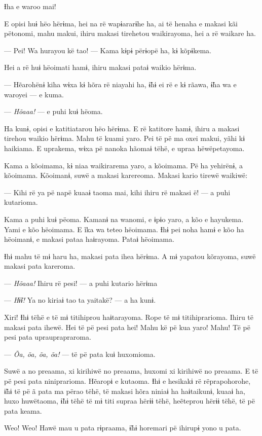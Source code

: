 Ɨha e waroo mai! 

E opisi huɨ hëo hërɨma, hei na rë wapɨararɨhe ha, ai të henaha e makasi
kãi pëtonomi, mahu makui, ihiru makasi tirehetou waikirayoma, hei a rë
waikare ha. 

--- Pei! Wa hurayou kë tao! --- Kama kɨpɨ përɨopë ha, kɨ kõpɨkema. 

Hei a rë huɨ hëoimati hamɨ, ihiru makasi pataɨ waikio hërɨma. 

--- Hẽarohënɨ kiha wɨxa kɨ hõra rë niayahi ha, ɨ̃hɨ ei rë e kɨ rãawa, ɨ̃ha
wa e waroyei --- e kuma. 

--- \textit{Hõaaa!} --- e puhi kuɨ hëoma. 

Ha kunɨ, opisi e katitiatarou hëo hërɨma. E rë katitore hamɨ, ihiru a
makasi tirehou waikio hërɨma. Mahu të kuami yaro. Pei të pë ma oxei
makui, yãhi kɨ haikiama. E uprakema, wɨxa pë nanoka hãomaɨ tëhë, e upraa
hëwëpetayoma. 

Kama a kõoimama, kɨ niaa waikirarema yaro, a kõoimama. Pë ha yehirënɨ, a
kõoimama. Kõoimanɨ, suwë a makasi karereoma. Makasi kario tirewë
waikiwë:

--- Kihi rë ya pë napë kuaaɨ taoma mai, kihi ihiru rë makasi ë! --- a
puhi kutarioma. 

Kama a puhi kuɨ pëoma. Kamanɨ na wanomi, e ɨpɨo yaro, a kõo e hayukema.
Yami e kõo hëoimama. E ĩka wa teteo hëoimama. Ɨhɨ pei noha hamɨ e kõo ha
hëoimanɨ, e makasi pataa haɨrayoma. Pataɨ hëoimama. 

Ɨhɨ mahu të mɨ haru ha, makasi pata ihea hërɨma. A mɨ yapatou kõrayoma,
suwë makasi pata kareroma. 

--- \textit{Hõaaa!} Ihiru rë pesi! --- a puhi kutario hërɨma 

--- \textit{Hɨ̃ɨ! }Ya no kiriaɨ tao ta yaitakë? --- a ha kunɨ. 

Xiri! Ɨhɨ tëhë e të mɨ titihiprou haɨtarayoma. Rope të mɨ
titihiprarioma. Ihiru të makasi pata ihewë. Hei të pë pesi pata hei!
Mahu kë pë kua yaro! Mahu! Të pë pesi pata uprauprapraroma. 

--- \textit{Õa, õa, õa, õa!} --- të pë pata kuɨ huxomioma. 

Suwë a no preaama, xi kirihiwë no preaama, huxomi xi kirihiwë no
preaama. E të pë pesi pata niniprarioma. Hẽaropɨ e kutaoma. Ɨhɨ e
hesikakɨ rë rëprapohorohe, ɨ̃hɨ të pë ã pata ma përao tëhë, të makasi
hõra niniaɨ ha haɨtaikunɨ, kuaaɨ ha, huxo huwëtaoma, ɨ̃hɨ tëhë të mɨ titi
supraa hërɨɨ tëhë, heẽteprou hërɨɨ tëhë, të pë pata keama. 

Weo! Weo! Hawë mau u pata rɨpraama, ɨ̃hɨ horemari pë ihirupɨ yono u
pata. 

